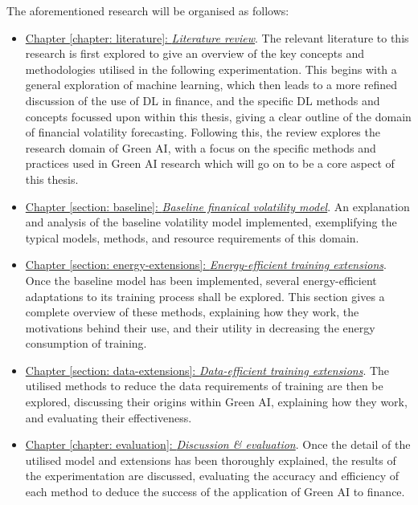 \documentclass[a4paper, 11pt]{report}
\begin{document}
    The aforementioned research will be organised as follows: 

    \begin{itemize}
        \item \underline{Chapter \ref{chapter: literature}: \emph{Literature review}}. The relevant literature to this research is first explored to give an overview of the key concepts and methodologies utilised in the following experimentation. This begins with a general exploration of machine learning, which then leads to a more refined discussion of the use of DL in finance, and the specific DL methods and concepts focussed upon within this thesis, giving a clear outline of the domain of financial volatility forecasting. Following this, the review explores the research domain of Green AI, with a focus on the specific methods and practices used in Green AI research which will go on to be a core aspect of this thesis.
        
        \item \underline{Chapter \ref{section: baseline}: \emph{Baseline finanical volatility model}}. An explanation and analysis of the baseline volatility model implemented, exemplifying the typical models, methods, and resource requirements of this domain.

        \item \underline{Chapter \ref{section: energy-extensions}: \emph{Energy-efficient training extensions}}. Once the baseline model has been implemented, several energy-efficient adaptations to its training process shall be explored. This section gives a complete overview of these methods, explaining how they work, the motivations behind their use, and their utility in decreasing the energy consumption of training.
        
        \item \underline{Chapter \ref{section: data-extensions}: \emph{Data-efficient training extensions}}. The utilised methods to reduce the data requirements of training are then be explored, discussing their origins within Green AI, explaining how they work, and evaluating their effectiveness.
        
        \item \underline{Chapter \ref{chapter: evaluation}: \emph{Discussion \& evaluation}}. Once the detail of the utilised model and extensions has been thoroughly explained, the results of the experimentation are discussed, evaluating the accuracy and efficiency of each method to deduce the success of the application of Green AI to finance.
    \end{itemize}
\end{document}
